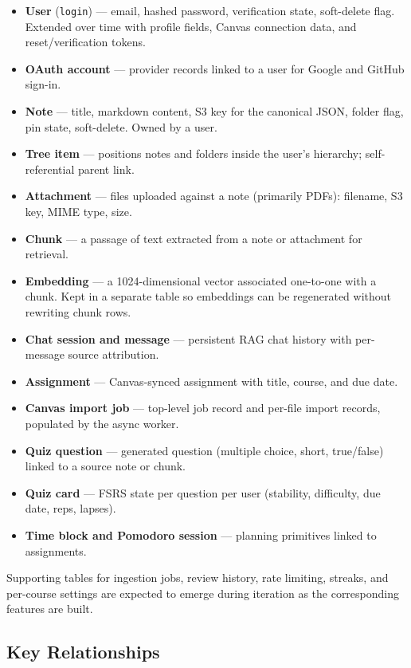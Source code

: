 \documentclass[12pt,a4paper]{article}
\begin{document}
\begin{itemize}
    \item \textbf{User} (\texttt{login}) --- email, hashed password, verification state, soft-delete flag. Extended over time with profile fields, Canvas connection data, and reset/verification tokens.
    \item \textbf{OAuth account} --- provider records linked to a user for Google and GitHub sign-in.
    \item \textbf{Note} --- title, markdown content, S3 key for the canonical JSON, folder flag, pin state, soft-delete. Owned by a user.
    \item \textbf{Tree item} --- positions notes and folders inside the user's hierarchy; self-referential parent link.
    \item \textbf{Attachment} --- files uploaded against a note (primarily PDFs): filename, S3 key, MIME type, size.
    \item \textbf{Chunk} --- a passage of text extracted from a note or attachment for retrieval.
    \item \textbf{Embedding} --- a 1024-dimensional vector associated one-to-one with a chunk. Kept in a separate table so embeddings can be regenerated without rewriting chunk rows.
    \item \textbf{Chat session and message} --- persistent RAG chat history with per-message source attribution.
    \item \textbf{Assignment} --- Canvas-synced assignment with title, course, and due date.
    \item \textbf{Canvas import job} --- top-level job record and per-file import records, populated by the async worker.
    \item \textbf{Quiz question} --- generated question (multiple choice, short, true/false) linked to a source note or chunk.
    \item \textbf{Quiz card} --- FSRS state per question per user (stability, difficulty, due date, reps, lapses).
    \item \textbf{Time block and Pomodoro session} --- planning primitives linked to assignments.
\end{itemize}

Supporting tables for ingestion jobs, review history, rate limiting, streaks, and per-course settings are expected to emerge during iteration as the corresponding features are built.

\subsection{Key Relationships}
\end{document}
